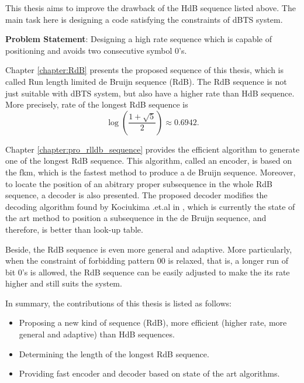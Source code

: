 This thesis aims to improve the drawback of the \gls{HdB} sequence listed above. The main task here is designing a code satisfying the constraints of \gls{dBTS} system.

\textbf{Problem Statement}: Designing a high rate sequence which is capable of positioning and avoids two consecutive symbol $0$'s.

Chapter \ref{chapter:RdB} presents the proposed sequence of this thesis, which is called Run length limited de Bruijn sequence (\gls{RdB}). The \gls{RdB} sequence is not just suitable with \gls{dBTS} system, but also have a higher rate than \gls{HdB} sequence. More precisely, rate of the longest \gls{RdB} sequence is \[\log\left(\dfrac{1+\sqrt{5}}{2}\right)\approx0.6942.\]

Chapter \ref{chapter:pro_rlldb_sequence} provides the efficient algorithm to generate one of the longest \gls{RdB} sequence. This algorithm, called an encoder, is based on the \gls{fkm}, which is the fastest method to produce a de Bruijn sequence. Moreover, to locate the position of an abitrary proper subsequence in the whole \gls{RdB} sequence, a decoder is also presented. The proposed decoder modifies the decoding algorithm found by Kociukima .et.al in \cite{kociumaka2016efficient}, which is currently the state of the art method to position a subsequence in the de Bruijn sequence, and therefore, is better than look-up table.

Beside, the \gls{RdB} sequence is even more general and adaptive. More particularly, when the constraint of forbidding pattern $00$ is relaxed, that is, a longer run of bit $0$'s is allowed, the \gls{RdB} sequence can be easily adjusted to make the its rate higher and still suits the system. 

In summary, the contributions of this thesis is listed as follows:
\begin{itemize}
    \item Proposing a new kind of sequence (\gls{RdB}), more efficient (higher rate, more general and adaptive) than \gls{HdB} sequences.
    \item Determining the length of the longest \gls{RdB} sequence.
    \item Providing fast encoder and decoder based on state of the art algorithms.
\end{itemize}